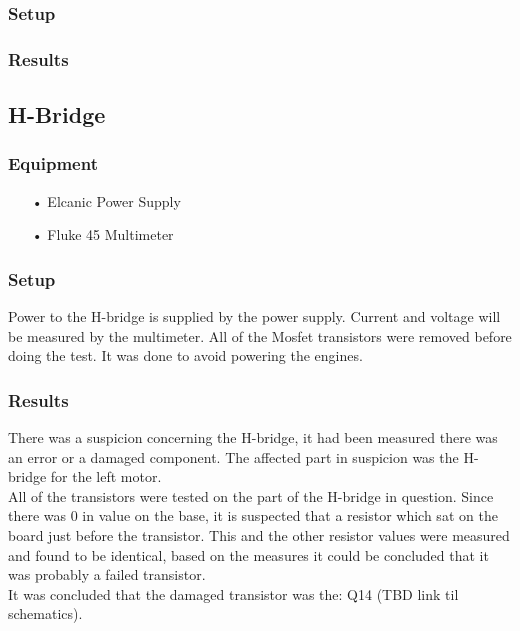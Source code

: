 \subsubsection{Setup}

\subsubsection{Results}

\subsection{H-Bridge}

\subsubsection{Equipment}
\begin{enumerate}
	\item[•]Elcanic Power Supply
	\item[•]Fluke 45 Multimeter
\end{enumerate}

\subsubsection{Setup}
Power to the H-bridge is supplied by the power supply. Current and voltage will be measured by the multimeter.
All of the Mosfet transistors were removed before doing the test. It was done to avoid powering the engines.


\subsubsection{Results}
There was a suspicion concerning the H-bridge, it had been measured there was an error or a damaged component. The affected part in suspicion was the H-bridge for the left motor.\\

All of the transistors were tested on the part of the H-bridge in question.
Since there was 0 in value on the base, it is suspected that a resistor which sat on the board just before the transistor. This and the other resistor values were measured and found to be identical, based on the measures it could be concluded that it was probably a failed transistor.\\

It was concluded that the damaged transistor was the: Q14 \cite{Q14}  
(TBD link til schematics).\\

